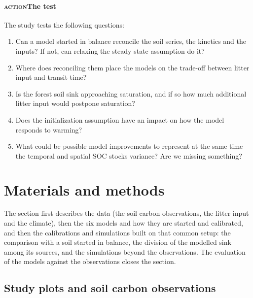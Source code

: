 \documentclass[11pt]{article}
\newcommand{\beat}[1]{\textcolor{black!45}{\textsc{\small #1}}\enspace}
\newcommand{\gap}[1]{\textcolor{red!70!black}{\small[\,#1\,]}}
\begin{document}
\paragraph{\beat{action}The test}
The study tests the following questions:
\begin{enumerate}\itemsep0pt
  \item[(i)] Can a model started in balance reconcile the soil series, the kinetics and the
    inputs? If not, can relaxing the steady state assumption do it?
  \item[(ii)] Where does reconciling them place the models on the trade-off between litter
    input and transit time?
  \item[(iii)] Is the forest soil sink approaching saturation, and if so how much additional litter input would postpone saturation?
  \item[(iv)] Does the initialization assumption have an impact on how the model responds to warming?
  \item[(v)] What could be possible model improvements to represent at the same time the temporal and spatial SOC stocks variance? Are we missing something?
\end{enumerate}


\section{Materials and methods}\label{sec:methods}

The section first describes the data (the soil carbon observations, the litter input and
the climate), then the six models and how they are started and calibrated, and then the
calibrations and simulations built on that common setup: the comparison with a soil
started in balance, the division of the modelled sink among its sources, and the
simulations beyond the observations. The evaluation of the models against the
observations closes the section.

\subsection{Study plots and soil carbon observations}\label{sec:plots}
\end{document}
